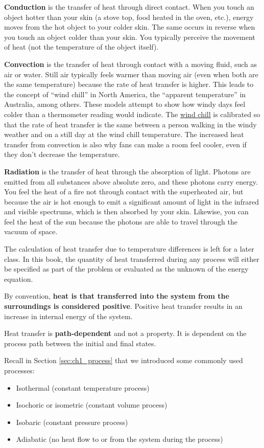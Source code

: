 {\bf Conduction} is the transfer of heat through direct contact.  When you touch an object hotter than your skin (a stove top, food heated in the oven, etc.), energy moves from the hot object to your colder skin.  The same occurs in reverse when you touch an object colder than your skin.  You typically perceive the movement of heat (not the temperature of the object itself).

{\bf Convection} is the transfer of heat through contact with a moving fluid, such as air or water.  Still air typically feels warmer than moving air (even when both are the same temperature) because the rate of heat transfer is higher.  This leads to the concept of ``wind chill'' in North America, the ``apparent temperature'' in Australia, among others.  These models attempt to show how windy days feel colder than a thermometer reading would indicate.  The \href{https://en.wikipedia.org/wiki/Wind_chill}{wind chill} is calibrated so that the rate of heat transfer is the same between a person walking in the windy weather and on a still day at the wind chill temperature.  The increased heat transfer from convection is also why fans can make a room feel cooler, even if they don't decrease the temperature.

{\bf Radiation} is the transfer of heat through the absorption of light.  Photons are emitted from all substances above absolute zero, and these photons carry energy.  You feel the heat of a fire not through contact with the superheated air, but because the air is hot enough to emit a significant amount of light in the infrared and visible spectrums, which is then absorbed by your skin.  Likewise, you can feel the heat of the sun because the photons are able to travel through the vacuum of space.

The calculation of heat transfer due to temperature differences is left for a later class.  In this book, the quantity of heat transferred during any process will either be specified as part of the problem or evaluated as the unknown of the energy equation.

By convention, {\bf heat is that transferred into the system from the surroundings is considered positive}. Positive heat transfer results in an increase in internal energy of the system.

Heat transfer is {\bf path-dependent} and not a property. It is dependent on the process path between the initial and final states.

Recall in Section \ref{sec:ch1_process} that we introduced some commonly used processes:
\begin{itemize}
\item Isothermal (constant temperature process)
\item Isochoric or isometric (constant volume process)
\item Isobaric (constant pressure process)
\item Adiabatic (no heat flow to or from the system during the process)
\end{itemize}

